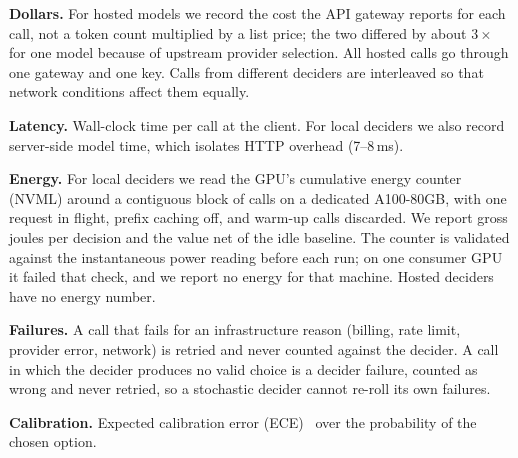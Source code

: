 \textbf{Dollars.} For hosted models we record the cost the API gateway reports for each call, not a token count multiplied by a list price; the two differed by about $3\times$ for one model because of upstream provider selection.
All hosted calls go through one gateway and one key.
Calls from different deciders are interleaved so that network conditions affect them equally.

\textbf{Latency.} Wall-clock time per call at the client.
For local deciders we also record server-side model time, which isolates HTTP overhead (7--8\,ms).

\textbf{Energy.} For local deciders we read the GPU's cumulative energy counter (NVML) around a contiguous block of calls on a dedicated A100-80GB, with one request in flight, prefix caching off, and warm-up calls discarded.
We report gross joules per decision and the value net of the idle baseline.
The counter is validated against the instantaneous power reading before each run; on one consumer GPU it failed that check, and we report no energy for that machine.
Hosted deciders have no energy number.

\textbf{Failures.} A call that fails for an infrastructure reason (billing, rate limit, provider error, network) is retried and never counted against the decider.
A call in which the decider produces no valid choice is a decider failure, counted as wrong and never retried, so a stochastic decider cannot re-roll its own failures.

\textbf{Calibration.} Expected calibration error (ECE)~\cite{guo2017calibration} over the probability of the chosen option.
